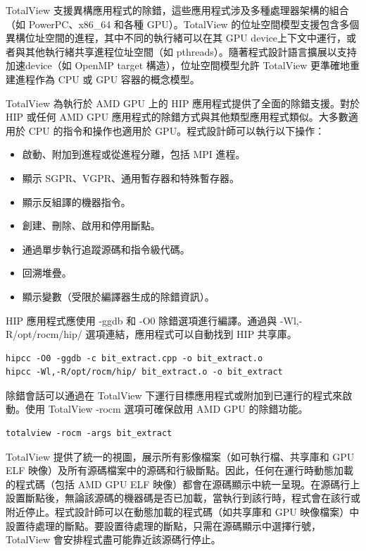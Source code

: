 TotalView 支援異構應用程式的除錯，這些應用程式涉及多種處理器架構的組合（如 PowerPC、x86\_64 和各種 GPU）。TotalView 的位址空間模型支援包含多個異構位址空間的進程，其中不同的執行緒可以在其 GPU device上下文中運行，或者與其他執行緒共享進程位址空間（如 pthreads）。隨著程式設計語言擴展以支持加速device（如 OpenMP target 構造），位址空間模型允許 TotalView 更準確地重建進程作為 CPU 或 GPU 容器的概念模型。



TotalView 為執行於 AMD GPU 上的 HIP 應用程式提供了全面的除錯支援。對於 HIP 或任何 AMD GPU 應用程式的除錯方式與其他類型應用程式類似。大多數適用於 CPU 的指令和操作也適用於 GPU。程式設計師可以執行以下操作：

\begin{itemize}
    \item 啟動、附加到進程或從進程分離，包括 MPI 進程。
    \item 顯示 SGPR、VGPR、通用暫存器和特殊暫存器。
    \item 顯示反組譯的機器指令。
    \item 創建、刪除、啟用和停用斷點。
    \item 通過單步執行追蹤源碼和指令級代碼。
    \item 回溯堆疊。
    \item 顯示變數（受限於編譯器生成的除錯資訊）。
\end{itemize}

HIP 應用程式應使用 -ggdb 和 -O0 除錯選項進行編譯。通過與 -Wl,-R/opt/rocm/hip/ 選項連結，應用程式可以自動找到 HIP 共享庫。

\begin{lstlisting}[caption={Listing 13.1: Example compiling a \textit{HIP} program for \textit{TotalView}.}]
hipcc -O0 -ggdb -c bit_extract.cpp -o bit_extract.o
hipcc -Wl,-R/opt/rocm/hip/ bit_extract.o -o bit_extract
\end{lstlisting}

除錯會話可以通過在 TotalView 下運行目標應用程式或附加到已運行的程式來啟動。使用 TotalView -rocm 選項可確保啟用 AMD GPU 的除錯功能。

\begin{lstlisting}[caption={Listing 13.2: Example HIP debugger launch in TotalView.}]
totalview -rocm -args bit_extract
\end{lstlisting}

TotalView 提供了統一的視圖，展示所有影像檔案（如可執行檔、共享庫和 GPU ELF 映像）及所有源碼檔案中的源碼和行級斷點。因此，任何在運行時動態加載的程式碼（包括 AMD GPU ELF 映像）都會在源碼顯示中統一呈現。在源碼行上設置斷點後，無論該源碼的機器碼是否已加載，當執行到該行時，程式會在該行或附近停止。程式設計師可以在動態加載的程式碼（如共享庫和 GPU 映像檔案）中設置待處理的斷點。要設置待處理的斷點，只需在源碼顯示中選擇行號，TotalView 會安排程式盡可能靠近該源碼行停止。

